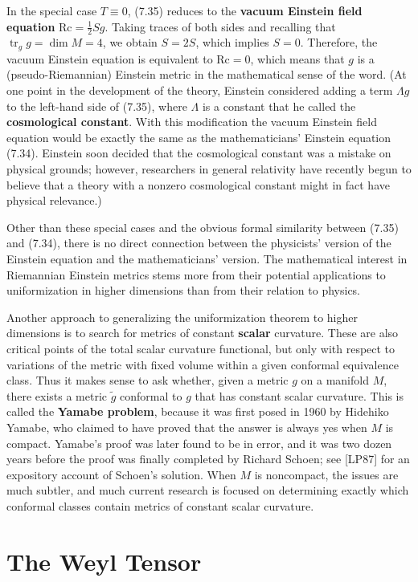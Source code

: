 In the special case $T \equiv 0$, (7.35) reduces to the \textbf{vacuum Einstein field equation} $\mathrm{Rc} = \tfrac{1}{2}Sg$. Taking traces of both sides and recalling that $\operatorname{tr}_g g = \dim M = 4$, we obtain $S = 2S$, which implies $S = 0$. Therefore, the vacuum Einstein equation is equivalent to $\mathrm{Rc} = 0$, which means that $g$ is a (pseudo-Riemannian) Einstein metric in the mathematical sense of the word. (At one point in the development of the theory, Einstein considered adding a term $\Lambda g$ to the left-hand side of (7.35), where $\Lambda$ is a constant that he called the \textbf{cosmological constant}. With this modification the vacuum Einstein field equation would be exactly the same as the mathematicians' Einstein equation (7.34). Einstein soon decided that the cosmological constant was a mistake on physical grounds; however, researchers in general relativity have recently begun to believe that a theory with a nonzero cosmological constant might in fact have physical relevance.)

Other than these special cases and the obvious formal similarity between (7.35) and (7.34), there is no direct connection between the physicists' version of the Einstein equation and the mathematicians' version. The mathematical interest in Riemannian Einstein metrics stems more from their potential applications to uniformization in higher dimensions than from their relation to physics.

Another approach to generalizing the uniformization theorem to higher dimensions is to search for metrics of constant \textbf{scalar} curvature. These are also critical points of the total scalar curvature functional, but only with respect to variations of the metric with fixed volume within a given conformal equivalence class. Thus it makes sense to ask whether, given a metric $g$ on a manifold $M$, there exists a metric $\tilde{g}$ conformal to $g$ that has constant scalar curvature. This is called the \textbf{Yamabe problem}, because it was first posed in 1960 by Hidehiko Yamabe, who claimed to have proved that the answer is always yes when $M$ is compact. Yamabe's proof was later found to be in error, and it was two dozen years before the proof was finally completed by Richard Schoen; see [LP87] for an expository account of Schoen's solution. When $M$ is noncompact, the issues are much subtler, and much current research is focused on determining exactly which conformal classes contain metrics of constant scalar curvature.

\section{The Weyl Tensor}

